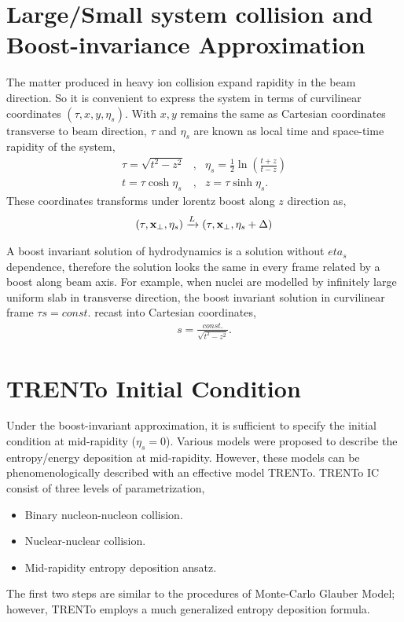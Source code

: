 \documentclass[aps,prl,twocolumn,groupedaddress]{revtex4-1}
\begin{document}
\section{Large/Small system collision and Boost-invariance Approximation}
	The matter produced in heavy ion collision expand rapidity in the beam direction. So it is convenient to express the system in terms of curvilinear coordinates $(\tau, x, y, \eta_s)$. 
	With $x, y$ remains the same as Cartesian coordinates transverse to beam direction, $\tau$ and $\eta_s$ are known as local time and space-time rapidity of the system,
	\begin{eqnarray}
		\tau = \sqrt{t^2 - z^2} &,& \eta_s = \frac{1}{2}\ln\left(\frac{t+z}{t-z}\right) \\
		t = \tau \cosh \eta_s &,& z = \tau \sinh \eta_s.
	\end{eqnarray}
	These coordinates transforms under lorentz boost along $z$ direction as,
	\begin{eqnarray}
		(\tau, {\bf x_{\perp}}, \eta_s) \xrightarrow{L} (\tau, {\bf x_{\perp}}, \eta_s + \Delta)
	\end{eqnarray}
	
	A boost invariant solution of hydrodynamics is a solution without $eta_s$ dependence, therefore the solution looks the same in every frame related by a boost along beam axis. 
	For example, when nuclei are modelled by infinitely large uniform slab in transverse direction, the boost invariant solution in curvilinear frame $\tau s = const.$ recast into Cartesian coordinates,
	\begin{eqnarray}
		s = \frac{const.}{\sqrt{t^2 - z^2}}.
	\end{eqnarray}
	
	\section{TRENTo Initial Condition}
	Under the boost-invariant approximation, it is sufficient to specify the initial condition at mid-rapidity ($\eta_s = 0$). Various models were proposed to describe the entropy/energy deposition at mid-rapidity. 
	However, these models can be phenomenologically described with an effective model TRENTo.
	TRENTo IC consist of three levels of parametrization,
	\begin{itemize}
		\item Binary nucleon-nucleon collision.
		\item Nuclear-nuclear collision.
		\item Mid-rapidity entropy deposition ansatz.
	\end{itemize}
	The first two steps are similar to the procedures of Monte-Carlo Glauber Model; however, TRENTo employs a much generalized entropy deposition formula.
\end{document}
